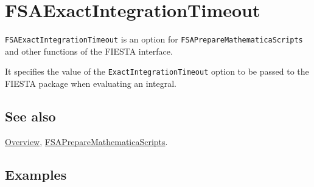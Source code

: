 \documentclass[../FeynHelpersManual.tex]{subfiles}
\begin{document}
\begin{Shaded}
\begin{Highlighting}[]
 
\end{Highlighting}
\end{Shaded}

\hypertarget{fsaexactintegrationtimeout}{
\section{FSAExactIntegrationTimeout}\label{fsaexactintegrationtimeout}}

\texttt{FSAExactIntegrationTimeout} is an option for
\texttt{FSAPrepareMathematicaScripts} and other functions of the FIESTA
interface.

It specifies the value of the \texttt{ExactIntegrationTimeout} option to
be passed to the FIESTA package when evaluating an integral.

\subsection{See also}

\hyperlink{toc}{Overview},
\hyperlink{fsapreparemathematicascripts}{FSAPrepareMathematicaScripts}.

\subsection{Examples}
\end{document}
